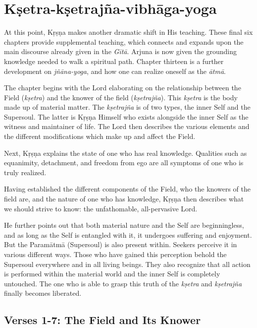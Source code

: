 \chapter{Kṣetra-kṣetrajña-vibhāga-yoga}\label{chap-ksetra-ksetrajna-vibhaga-yoga}

\noindent At this point, Kṛṣṇa makes another dramatic shift in His teaching. These final six chapters provide supplemental teaching, which connects and expands upon the main discourse already given in the \textit{Gītā}. Arjuna is now given the grounding knowledge needed to walk a spiritual path. Chapter thirteen is a further development on \textit{jñāna-yoga}, and how one can realize oneself as the \textit{ātmā}.

The chapter begins with the Lord elaborating on the relationship between the Field (\textit{kṣetra}) and the knower of the field (\textit{kṣetrajña}). This \textit{kṣetra} is the body made up of material matter. The \textit{kṣetrajña} is of two types, the inner Self and the Supersoul. The latter is Kṛṣṇa Himself who exists alongside the inner Self as the witness and maintainer of life. The Lord then describes the various elements and the different modifications which make up and affect the Field.

Next, Kṛṣṇa explains the state of one who has real knowledge. Qualities such as equanimity, detachment, and freedom from ego are all symptoms of one who is truly realized.

Having established the different components of the Field, who the knowers of the field are, and the nature of one who has knowledge, Kṛṣṇa then describes what we should strive to know: the unfathomable, all-pervasive Lord.

He further points out that both material nature and the Self are beginningless, and as long as the Self is entangled with it, it undergoes suffering and enjoyment. But the Paramātmā (Supersoul) is also present within. Seekers perceive it in various different ways. Those who have gained this perception behold the Supersoul everywhere and in all living beings. They also recognize that all action is performed within the material world and the inner Self is completely untouched. The one who is able to grasp this truth of the \textit{kṣetra} and \textit{kṣetrajña} finally becomes liberated.

\section{Verses 1-7: The Field and Its Knower}\label{sec-verses-1-7-the-field-and-its-knower}



